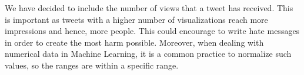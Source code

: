 
We have decided to include the number of views that a tweet has received. This is important as tweets with a higher number of visualizations reach more impressions and hence, more people. This could encourage to write hate messages in order to create the most harm possible. Moreover, when dealing with numerical data in Machine Learning, it is a common practice to normalize such values, so the ranges are within a specific range.